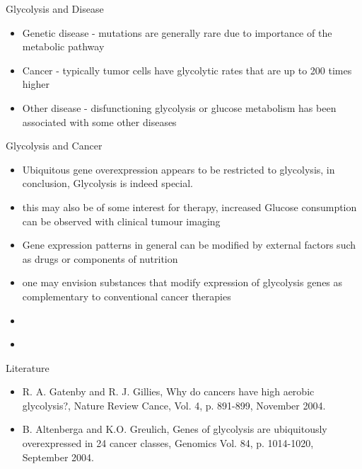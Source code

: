 \begin{frame}{Glycolysis and Disease}
	\begin{itemize}
		\item Genetic disease - mutations are generally rare due to importance of the metabolic pathway
		\item Cancer - typically tumor cells have glycolytic rates that are up to 200 times higher
		\item Other disease - disfunctioning glycolysis or glucose metabolism has been associated with some other diseases
	\end{itemize}
\end{frame}

\begin{frame}{Glycolysis and Cancer}
	\begin{itemize}
		\item Ubiquitous gene overexpression appears to be restricted to glycolysis, in conclusion, Glycolysis is indeed special.
		\item this may also be of some interest for therapy, increased Glucose consumption can be observed with clinical tumour imaging 
		\item Gene expression patterns in general can be modified by external factors such as drugs or components of nutrition
		\item one may envision substances that modify expression of glycolysis genes as complementary to conventional cancer therapies
	\end{itemize}
\end{frame}

\begin{frame}
	\begin{itemize}
		\item
	\end{itemize}
\end{frame}

\begin{frame}
	\begin{itemize}
		\item
	\end{itemize}
\end{frame}

\begin{frame}{Literature}
	\begin{itemize}
		\item R. A. Gatenby and R. J. Gillies, Why do cancers have high aerobic glycolysis?, Nature Review Cance, Vol. 4, p. 891-899, November 2004.
		\item B. Altenberga and K.O. Greulich, Genes of glycolysis are ubiquitously overexpressed in 24 cancer classes, Genomics Vol. 84, p. 1014-1020, September 2004.
	\end{itemize}
\end{frame}

